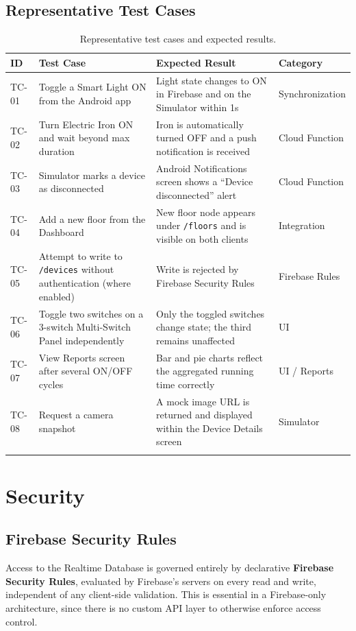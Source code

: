 \documentclass[11pt,a4paper]{article}
\begin{document}
\subsection{Representative Test Cases}
\begin{longtable}{@{}p{0.8cm}p{5.0cm}p{3.6cm}p{3.0cm}@{}}
\toprule
\textbf{ID} & \textbf{Test Case} & \textbf{Expected Result} & \textbf{Category} \\
\midrule
\endhead
TC-01 & Toggle a Smart Light ON from the Android app & Light state changes to ON in Firebase and on the Simulator within 1s & Synchronization \\
TC-02 & Turn Electric Iron ON and wait beyond max duration & Iron is automatically turned OFF and a push notification is received & Cloud Function \\
TC-03 & Simulator marks a device as disconnected & Android Notifications screen shows a ``Device disconnected'' alert & Cloud Function \\
TC-04 & Add a new floor from the Dashboard & New floor node appears under \texttt{/floors} and is visible on both clients & Integration \\
TC-05 & Attempt to write to \texttt{/devices} without authentication (where enabled) & Write is rejected by Firebase Security Rules & Firebase Rules \\
TC-06 & Toggle two switches on a 3-switch Multi-Switch Panel independently & Only the toggled switches change state; the third remains unaffected & UI \\
TC-07 & View Reports screen after several ON/OFF cycles & Bar and pie charts reflect the aggregated running time correctly & UI / Reports \\
TC-08 & Request a camera snapshot & A mock image URL is returned and displayed within the Device Details screen & Simulator \\
\bottomrule
\caption{Representative test cases and expected results.}
\label{tab:test-cases}
\end{longtable}

\section{Security}
\label{sec:security}

\subsection{Firebase Security Rules}
Access to the Realtime Database is governed entirely by declarative \textbf{Firebase Security Rules}, evaluated by Firebase's servers on every read and write, independent of any client-side validation. This is essential in a Firebase-only architecture, since there is no custom API layer to otherwise enforce access control.
\end{document}

